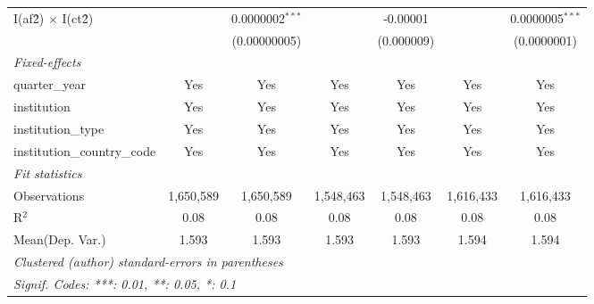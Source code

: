 \begin{tabular}{lcccccc}
   I(af\^2) $\times$ I(ct\^2)         &               & 0.0000002$^{***}$ &               & -0.00001        &               & 0.0000005$^{***}$\\   
                                      &               & (0.00000005)      &               & (0.000009)      &               & (0.0000001)\\   
   \midrule
   \emph{Fixed-effects}\\
   quarter\_year                      & Yes           & Yes               & Yes           & Yes             & Yes           & Yes\\  
   institution                        & Yes           & Yes               & Yes           & Yes             & Yes           & Yes\\  
   institution\_type                  & Yes           & Yes               & Yes           & Yes             & Yes           & Yes\\  
   institution\_country\_code         & Yes           & Yes               & Yes           & Yes             & Yes           & Yes\\  
   \midrule
   \emph{Fit statistics}\\
   Observations                       & 1,650,589     & 1,650,589         & 1,548,463     & 1,548,463       & 1,616,433     & 1,616,433\\  
   R$^2$                              & 0.08          & 0.08              & 0.08          & 0.08            & 0.08          & 0.08\\  
Mean(Dep. Var.) & 1.593 & 1.593 & 1.593 & 1.593 & 1.594 & 1.594 \\
   \midrule \midrule
   \multicolumn{7}{l}{\emph{Clustered (author) standard-errors in parentheses}}\\
   \multicolumn{7}{l}{\emph{Signif. Codes: ***: 0.01, **: 0.05, *: 0.1}}\\
\end{tabular}
\par\endgroup
